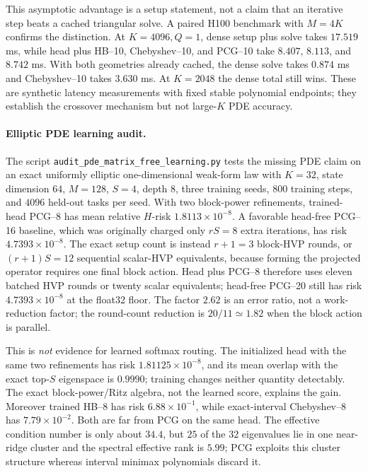 \documentclass[11pt]{article}
\begin{document}
This asymptotic advantage is a setup statement, not a claim that an iterative
step beats a cached triangular solve.  A paired H100 benchmark with $M=4K$
confirms the distinction.  At $K=4096,Q=1$, dense setup plus solve takes
$17.519$ ms, while head plus HB--10, Chebyshev--10, and PCG--10 take $8.407$,
$8.113$, and $8.742$ ms.  With both geometries already cached, the dense solve
takes $0.874$ ms and Chebyshev--10 takes $3.630$ ms.  At $K=2048$ the dense
total still wins.  These are synthetic latency measurements with fixed stable
polynomial endpoints; they establish the crossover mechanism but not
large-$K$ PDE accuracy.

\paragraph{Elliptic PDE learning audit.}
The script
\texttt{audit\_pde\_matrix\_free\_learning.py} tests the missing PDE claim on
an exact uniformly elliptic one-dimensional weak-form law with
\(K=32\), state dimension \(64\), \(M=128\), \(S=4\), depth \(8\), three
training seeds, \(800\) training steps, and \(4096\) held-out tasks per seed.
With two block-power refinements, trained-head PCG--8 has mean relative
\(H\)-risk \(1.8113\times10^{-8}\).  A favorable head-free PCG--16 baseline,
which was originally charged only \(rS=8\) extra iterations, has risk
\(4.7393\times10^{-8}\).  The exact setup count is instead \(r+1=3\)
block-HVP rounds, or \((r+1)S=12\) sequential scalar-HVP equivalents, because
forming the projected operator requires one final block action.  Head plus
PCG--8 therefore uses eleven batched HVP rounds or twenty scalar equivalents;
head-free PCG--20 still has risk \(4.7393\times10^{-8}\) at the float32 floor.
The factor \(2.62\) is an error ratio, not a work-reduction factor; the
round-count reduction is \(20/11\simeq1.82\) when the block action is parallel.

This is \emph{not} evidence for learned softmax routing.  The initialized
head with the same two refinements has risk \(1.81125\times10^{-8}\), and its
mean overlap with the exact top-\(S\) eigenspace is \(0.9990\); training
changes neither quantity detectably.  The exact block-power/Ritz algebra,
not the learned score, explains the gain.  Moreover trained HB--8 has risk
\(6.88\times10^{-1}\), while exact-interval Chebyshev--8 has
\(7.79\times10^{-2}\).  Both are far from PCG on the same head.  The
effective condition number is only about \(34.4\), but \(25\) of the \(32\)
eigenvalues lie in one near-ridge cluster and the spectral effective rank is
\(5.99\); PCG exploits this cluster structure whereas interval minimax
polynomials discard it.
\end{document}
